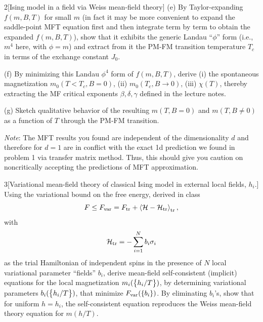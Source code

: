 \documentclass[12pt]{article}
\begin{document}
\begin{problem}{2}[Ising model in a field via Weiss mean-field theory]
(e) By Taylor-expanding $f(m,B,T)$ for small $m$ (in fact it may be more
convenient to expand the saddle-point MFT equation first and then integrate term
by term to obtain the expanded $f(m,B,T)$), show that it exhibits the generic
Landau ``$\phi$'' form (i.e., $m^4$ here, with $\phi=m$) and extract from it the
PM-FM transition temperature $T_c$ in terms of the exchange constant $J_0$.

(f) By minimizing this Landau $\phi^4$ form of $f(m,B,T)$, derive (i) the
spontaneous magnetization $m_0(T<T_c,B=0)$, (ii) $m_0(T_c,B\to0)$, (iii)
$\chi(T)$, thereby extracting the MF critical exponents $\beta,\delta,\gamma$
defined in the lecture notes.

(g) Sketch qualitative behavior of the resulting $m(T,B=0)$ and $m(T,B\neq0)$ as
a function of $T$ through the PM-FM transition.

\textit{Note}: The MFT results you found are independent of the dimensionality
$d$ and therefore for $d=1$ are in conflict with the exact 1d prediction we
found in problem 1 via transfer matrix method. Thus, this should give you
caution on noncritically accepting the predictions of MFT approximation.
\begin{solution}
\end{solution}
\end{problem}
\newpage
\begin{problem}{3}[Variational mean-field theory of classical Ising model in
    external local fields, $h_i$.]
Using the variational bound on the free energy, derived in class
\begin{equation}
    F\leq F_{\text{var}}=F_{\text{tr}}+\expval{\mathcal{H}-\mathcal{H}_{\text{tr}}}_{\text{tr}}, 
\end{equation}
with
\begin{equation}
    \mathcal{H}_{\text{tr}}=-\sum_{i=1}^Nb_i\sigma_i
\end{equation}
as the trial Hamiltonian of independent spins in the presence of $N$ local
variational parameter ``fields'' $b_i$, derive mean-field self-consistent
(implicit) equations for the local magnetization $m_i(\qty{h_i/T})$, by
determining variational parameters $b_i(\qty{h_i/T})$, that minimize
$F_{\text{var}}(\qty{b_i})$. By eliminating $b_i$'s, show that for uniform $h=h_i$,
the self-consistent equation reproduces the Weiss mean-field theory equation for
$m(h/T)$.
\begin{solution}
\end{solution}
\end{problem}
\end{document}
